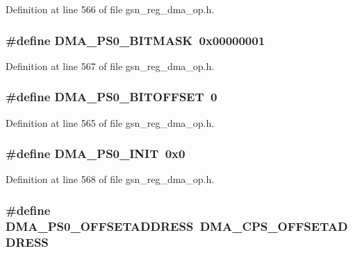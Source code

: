 Definition at line 566 of file gsn\_\-reg\_\-dma\_\-op.h.

\hypertarget{a00547_a68cb7e1cf6a811f4f71ff2c79ed31612}{
\subsubsection[{DMA\_\-PS0\_\-BITMASK}]{\setlength{\rightskip}{0pt plus 5cm}\#define DMA\_\-PS0\_\-BITMASK~0x00000001}}
\label{a00547_a68cb7e1cf6a811f4f71ff2c79ed31612}


Definition at line 567 of file gsn\_\-reg\_\-dma\_\-op.h.

\hypertarget{a00547_a0509ac9faa4e7810fe7e2fce18a3b491}{
\subsubsection[{DMA\_\-PS0\_\-BITOFFSET}]{\setlength{\rightskip}{0pt plus 5cm}\#define DMA\_\-PS0\_\-BITOFFSET~0}}
\label{a00547_a0509ac9faa4e7810fe7e2fce18a3b491}


Definition at line 565 of file gsn\_\-reg\_\-dma\_\-op.h.

\hypertarget{a00547_ad301b17707fb742f1438c755cee96ee0}{
\subsubsection[{DMA\_\-PS0\_\-INIT}]{\setlength{\rightskip}{0pt plus 5cm}\#define DMA\_\-PS0\_\-INIT~0x0}}
\label{a00547_ad301b17707fb742f1438c755cee96ee0}


Definition at line 568 of file gsn\_\-reg\_\-dma\_\-op.h.

\hypertarget{a00547_a2e5513883969ce188f238b95fe889c53}{
\subsubsection[{DMA\_\-PS0\_\-OFFSETADDRESS}]{\setlength{\rightskip}{0pt plus 5cm}\#define DMA\_\-PS0\_\-OFFSETADDRESS~DMA\_\-CPS\_\-OFFSETADDRESS}}
\label{a00547_a2e5513883969ce188f238b95fe889c53}


